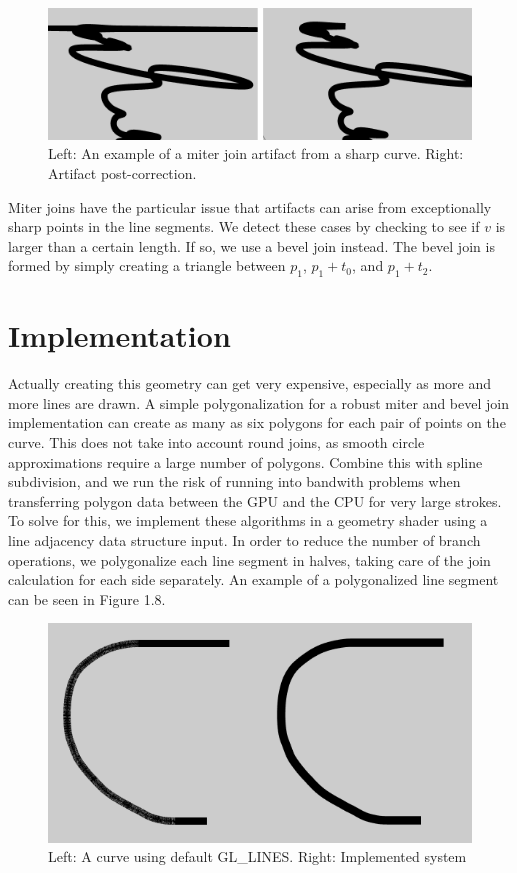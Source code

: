 \documentclass[11pt]{report}
\begin{document}
\begin{figure}
\includegraphics[width=\textwidth]{joinartifact.png}
\caption{Left: An example of a miter join artifact from a sharp curve. Right: Artifact post-correction.}
\end{figure}

Miter joins have the particular issue that artifacts can arise from exceptionally sharp points in the line segments.
We detect these cases by checking to see if $v$ is larger than a certain length.
If so, we use a bevel join instead.
The bevel join is formed by simply creating a triangle between $p_1$, $p_1 + t_0$, and $p_1 + t_2$.

\pagebreak
\section{Implementation}

Actually creating this geometry can get very expensive, especially as more and more lines are drawn. 
A simple polygonalization for a robust miter and bevel join implementation can create as many as six polygons for each pair of points on the curve.
This does not take into account round joins, as smooth circle approximations require a large number of polygons.
Combine this with spline subdivision, and we run the risk of running into bandwith problems when transferring polygon data between the GPU and the CPU for very large strokes.
To solve for this, we implement these algorithms in a geometry shader using a line adjacency data structure input.
In order to reduce the number of branch operations, we polygonalize each line segment in halves, taking care of the join calculation for each side separately.
An example of a polygonalized line segment can be seen in Figure 1.8.

\begin{figure}
\includegraphics{linerendering}
\caption{Left: A curve using default GL\_LINES. Right: Implemented system}
\end{figure}
\end{document}
